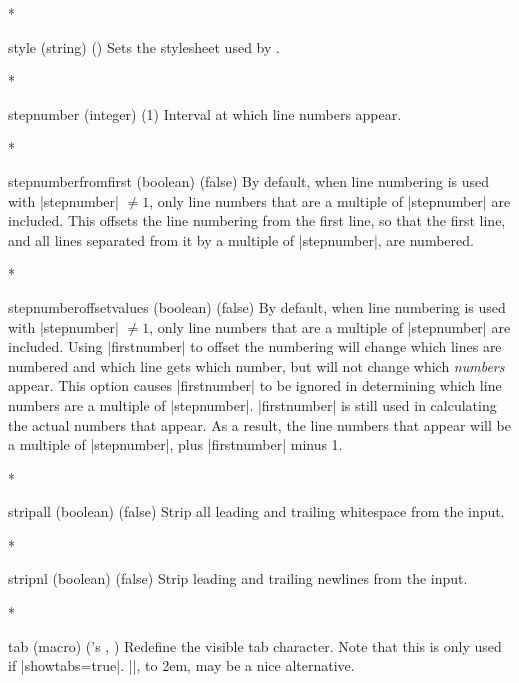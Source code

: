\begin{paracol}{2}
\begin{optionlist}
\switchcolumn[0]*%
  \item[style] (string) ()
    Sets the stylesheet used by .
    \switchcolumn

\switchcolumn[0]*%
  \item[stepnumber (integer) (1)]
    Interval at which line numbers appear.
    \switchcolumn

    \switchcolumn[0]*%

\item[stepnumberfromfirst (boolean) (false)]
By default, when line numbering is used with |stepnumber| $\ne 1$, only line numbers that are a multiple of |stepnumber| are included.  This offsets the line numbering from the first line, so that the first line, and all lines separated from it by a multiple of |stepnumber|, are numbered.

\switchcolumn

\switchcolumn[0]*%
\item[stepnumberoffsetvalues (boolean) (false)]
By default, when line numbering is used with |stepnumber| $\ne 1$, only line numbers that are a multiple of |stepnumber| are included.  Using |firstnumber| to offset the numbering will change which lines are numbered and which line gets which number, but will not change which \emph{numbers} appear.  This option causes |firstnumber| to be ignored in determining which line numbers are a multiple of |stepnumber|.  |firstnumber| is still used in calculating the actual numbers that appear.  As a result, the line numbers that appear will be a multiple of |stepnumber|, plus |firstnumber| minus 1.
\switchcolumn

\switchcolumn[0]*%

  \item[stripall (boolean) (false)]
    Strip all leading and trailing whitespace from the input.
    \switchcolumn

\switchcolumn[0]*%
  \item[stripnl (boolean) (false)]
    Strip leading and trailing newlines from the input.

    \switchcolumn

    \switchcolumn[0]*%
\item[tab (macro) ({\rmfamily\pkg{fancyvrb}'s} \string\FancyVerbTab, \FancyVerbTab)]
Redefine the visible tab character.  Note that this is only used if |showtabs=true|.  |\rightarrowfill|, \hbox to 2em{\rightarrowfill}, may be a nice alternative.
\switchcolumn


\end{optionlist}
\end{paracol}
